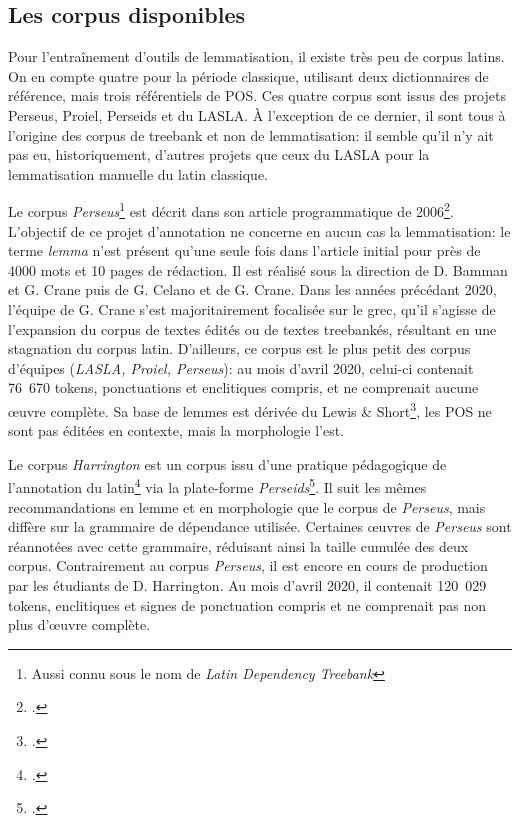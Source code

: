 \subsection{Les corpus disponibles}

Pour l'entraînement d'outils de lemmatisation, il existe très peu de corpus latins. On en compte quatre pour la période classique, utilisant deux dictionnaires de référence, mais trois référentiels de POS. Ces quatre corpus sont issus des projets Perseus, Proiel, Perseids et du LASLA. À l'exception de ce dernier, il sont tous à l'origine des corpus de treebank et non de lemmatisation: il semble qu'il n'y ait pas eu, historiquement, d'autres projets que ceux du LASLA pour la lemmatisation manuelle du latin classique.

Le corpus \textit{Perseus}\footnote{Aussi connu sous le nom de \textit{Latin Dependency Treebank}} est décrit dans son article programmatique de 2006\footcite{bamman_design_2006}. L'objectif de ce projet d'annotation ne concerne en aucun cas la lemmatisation: le terme \textit{lemma} n'est présent qu'une seule fois dans l'article initial pour près de 4000 mots et 10 pages de rédaction. Il est réalisé sous la direction de D. Bamman et G. Crane puis de G. Celano et de G. Crane. Dans les années précédant 2020, l'équipe de G. Crane s'est majoritairement focalisée sur le grec, qu'il s'agisse de l'expansion du corpus de textes édités ou de textes treebankés, résultant en une stagnation du corpus latin. D'ailleurs, ce corpus est le plus petit des corpus d'équipes (\textit{LASLA, Proiel, Perseus}): au mois d'avril 2020, celui-ci contenait 76~670 tokens, ponctuations et enclitiques compris, et ne comprenait aucune œuvre complète. Sa base de lemmes est dérivée du Lewis \& Short\footcite{shorts_latin_1958}, les POS ne sont pas éditées en contexte, mais la morphologie l'est.

Le corpus \textit{Harrington} est un corpus issu d'une pratique pédagogique de l'annotation du latin\footcite{noauthor_harrington_nodate} via la plate-forme \textit{Perseids}\footcite{almas_perseids_2016}. Il suit les mêmes recommandations en lemme et en morphologie que le corpus de \textit{Perseus}, mais diffère sur la grammaire de dépendance utilisée. Certaines œuvres de \textit{Perseus} sont réannotées avec cette grammaire, réduisant ainsi la taille cumulée des deux corpus. Contrairement au corpus \textit{Perseus}, il est encore en cours de production par les étudiants de D. Harrington. Au mois d'avril 2020, il contenait 120~029 tokens, enclitiques et signes de ponctuation compris et ne comprenait pas non plus d'œuvre complète. 

